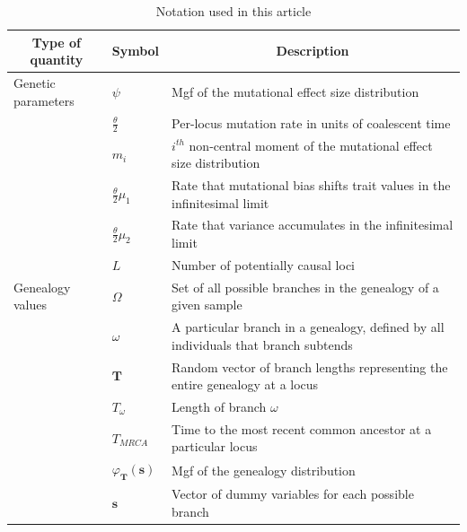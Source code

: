 \begin{table}
  \caption{Notation used in this article}
  \centering
  \begin{tabular}{l l l}
    \hline
    \multicolumn{1}{c}{Type of quantity} &\multicolumn{1}{c}{Symbol} & \multicolumn{1}{c}{Description} \\
    \hline
    Genetic parameters & $\psi$ & \multicolumn{1}{p{10cm}}{Mgf of the mutational effect size distribution }\\
                                         & $\frac{\theta}{2}$ & \multicolumn{1}{p{10cm}}{Per-locus mutation rate in units of coalescent time}\\
                                         & $m_i$ &  \multicolumn{1}{p{10cm}}{$i^{th}$ non-central moment of the mutational effect size distribution}\\
                                         & $\frac{\theta}{2}\mu_1$ & \multicolumn{1}{p{10cm}}{Rate that mutational bias shifts trait values in the infinitesimal limit}\\
                                         & $\frac{\theta}{2}\mu_2$ & \multicolumn{1}{p{10cm}}{Rate that variance accumulates in the infinitesimal limit}\\
                                         & $L$ & \multicolumn{1}{p{10cm}}{Number of potentially causal loci}\\
    Genealogy values &  $\Omega$ & \multicolumn{1}{p{10cm}}{Set of all possible branches in the genealogy of a given sample}\\
                                         & $\omega$ & \multicolumn{1}{p{10cm}}{A particular branch in a genealogy, defined by all individuals that branch subtends}\\
                                         & $\mathbf{T}$ & \multicolumn{1}{p{10cm}}{Random vector of branch lengths representing the entire genealogy at a locus}\\
                                         & $T_\omega$ & \multicolumn{1}{p{10cm}}{Length of branch $\omega$} \\
                                         & $T_{MRCA}$ & \multicolumn{1}{p{10cm}}{Time to the most recent common ancestor at a particular locus}\\
                                         & $\varphi_{\mathbf{T}}(\mathbf{s})$ & Mgf of the genealogy distribution \\
                                         & $\mathbf{s}$ & Vector of dummy variables for each possible branch\\

\end{tabular}
\end{table}
